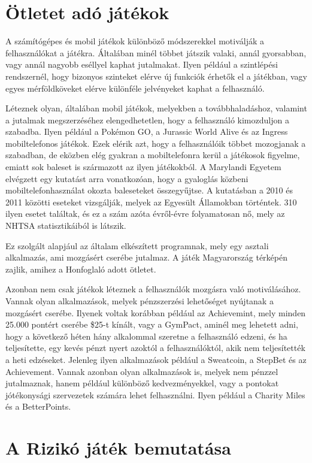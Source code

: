 \section{Ötletet adó játékok}

A számítógépes és mobil játékok különböző módszerekkel motiválják a felhasználókat a játékra.
Általában minél többet játszik valaki, annál gyorsabban, vagy annál nagyobb eséllyel kaphat jutalmakat.
Ilyen például a szintlépési rendszernél, hogy bizonyos szinteket elérve új funkciók érhetők el a játékban, vagy egyes mérföldköveket elérve különféle jelvényeket kaphat a felhasználó.

Léteznek olyan, általában mobil játékok, melyekben a továbbhaladáshoz, valamint a jutalmak megszerzéséhez elengedhetetlen, hogy a felhasználó kimozduljon a szabadba.
Ilyen például a Pokémon GO, a Jurassic World Alive és az Ingress mobiltelefonos játékok.
Ezek elérik azt, hogy a felhasználóik többet mozogjanak a szabadban, de eközben elég gyakran a mobiltelefonra kerül a játékosok figyelme, emiatt sok baleset is származott az ilyen játékokból.
A Marylandi Egyetem elvégzett egy kutatást arra vonatkozóan, hogy a gyaloglás közbeni mobiltelefonhasználat okozta baleseteket összegyűjtse.
A kutatásban a 2010 és 2011 közötti eseteket vizsgálják, melyek az Egyesült Államokban történtek.
310 ilyen esetet találtak, és ez a szám azóta évről-évre folyamatosan nő, mely az NHTSA statisztikáiból is látszik.\cite{nhtsa, maryland}
 
Ez szolgált alapjául az általam elkészített programnak, mely egy asztali alkalmazás, ami mozgásért cserébe jutalmaz.
A játék Magyarország térképén zajlik, amihez a Honfoglaló adott ötletet. 

Azonban nem csak játékok léteznek a felhasználók mozgásra való motiválásához.
Vannak olyan alkalmazások, melyek pénzszerzési lehetőséget nyújtanak a mozgásért cserébe.
Ilyenek voltak korábban például az Achievemint, mely minden 25.000 pontért cserébe \$25-t kínált, vagy a GymPact, aminél meg lehetett adni, hogy a következő héten hány alkalommal szeretne a felhasználó edzeni, és ha teljesítette, egy kevés pénzt nyert azoktól a felhasználóktól, akik nem teljesítették a heti edzéseket.\cite{app}
Jelenleg ilyen alkalmazások például a Sweatcoin, a StepBet és az Achievement.
Vannak azonban olyan alkalmazások is, melyek nem pénzzel jutalmaznak, hanem például különböző kedvezményekkel, vagy a pontokat jótékonysági szervezetek számára lehet felhasználni.
Ilyen például a Charity Miles és a BetterPoints.


\section{A Rizikó játék bemutatása}

